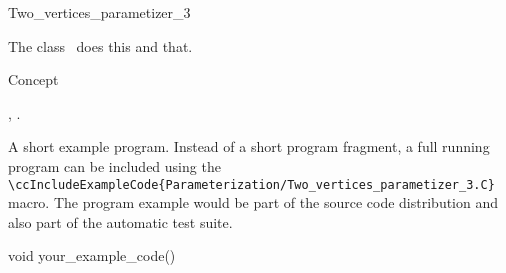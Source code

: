 

\begin{ccRefClass}{Two_vertices_parametizer_3}  %


\ccDefinition
  
The class \ccRefName\ does this and that.


\ccIsModel

Concept

\ccTypes


\ccCreation
{}  %


\ccOperations


\ccSeeAlso

,
.

\ccExample

A short example program.
Instead of a short program fragment, a full running program can be
included using the 
\verb|\ccIncludeExampleCode{Parameterization/Two_vertices_parametizer_3.C}| 
macro. The program example would be part of the source code distribution and
also part of the automatic test suite.

\begin{ccExampleCode}
void your_example_code() {
}
\end{ccExampleCode}


\end{ccRefClass}


